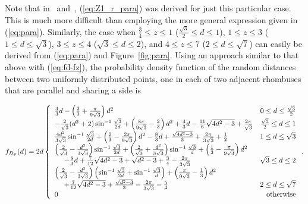 \documentclass[12pt,draftclsnofoot,onecolumn]{IEEEtran}
\begin{document}
Note that in~\cite{zhuang2011random}
and~\cite{zhuang2012geometrical}, (\ref{eq:Z1_r_para}) was derived for just this particular case.
This is much more difficult than employing the more general expression given in (\ref{eq:para}).
Similarly, the case when $\frac{3}{4} \leq z \leq 1$ ($\frac{\sqrt{3}}{2}\leq
d\leq 1$), $1 \leq z \leq 3$ ($1\leq d\leq \sqrt{3}$), $3 \leq z \leq 4$ ($\sqrt{3}\leq
d\leq 2$), and $4 \leq z \leq 7$ ($2\leq d\leq \sqrt{7}$) can
easily be derived from (\ref{eq:para}) and Figure~\ref{fig:para}.
Using an approach similar to that above with (\ref{eq:fd-fz}), the probability density
function of the random distances between two uniformly distributed points, one
in each of two adjacent rhombuses that are parallel and sharing a side is
\begin{small}
 \begin{equation}\label{eq:fd_r_para}
  f_{D_{\rm P}}(d)=2d\left\{
    \begin{array}{lr}

\frac{4}{3}d-\left(\frac{2}{3}+\frac{\pi}{9\sqrt{3}}\right)d^2 & 0\leq d\leq
\frac{\sqrt{3}}{2}\\

-\frac{2}{\sqrt{3}}(d^2+2)\sin^{-1}\frac{\sqrt{3}}{2d}+\left(\frac{8\pi}
{9\sqrt{3}}-\frac{2}{3}\right)d^2+\frac{4}{3}d-\frac{11}{6}\sqrt{4d^2-3}+\frac{
2\pi}{\sqrt{3}} & \frac{\sqrt{3}}{2}\leq d\leq 1\\

\frac{4d^2}{3\sqrt{3}}\sin^{-1}\frac{\sqrt{3}}{2d}+\left(\frac{2}{3}
-\frac{2\pi}{9\sqrt{3}}\right)d^2-\frac{8}{3}d+\frac{\sqrt{4d^2-3}}{3}+\frac{
2\pi}{3\sqrt{3}}+\frac{1}{2} & 1\leq d\leq \sqrt{3} \\

\left(\frac{2}{\sqrt{3}}-\frac{d^2}{3\sqrt{3}}\right)\sin^{-1}\frac{\sqrt
{3}}{2d}+\left(\frac{2}{\sqrt{3}}+\frac{d^2}{3\sqrt{3}}\right)\sin^{-1}\frac{
\sqrt{3}}{d}+\left(\frac{1}{3}-\frac{\pi}{9\sqrt{3}}\right)d^2 \\
~~~~-\frac{8}{3}d+\frac{7}{12}\sqrt{4d^2-3}+\sqrt{d^2-3}+\frac{3}{4}
-\frac{2\pi}{3\sqrt{3}} & \sqrt{3}\leq d\leq 2 \\

\left(\frac{2}{\sqrt{3}}-\frac{d^2}{3\sqrt{3}}\right)\left(\sin^{-1}\frac{
\sqrt{3}}{2d}+\sin^{-1}\frac{\sqrt{3}}{d}\right)+\left(\frac{\pi}{9\sqrt{3}}
-\frac{1}{3 }\right)d^2 \\
~~~~+\frac{7}{12}\sqrt{4d^2-3}+\frac{\sqrt{d^2-3}}{3}-\frac{2\pi}{3\sqrt{3}}
-\frac{5}{4} & 2 \leq d \leq \sqrt{7} \\

      0 & {\rm otherwise}
    \end{array}
 \right..
\end{equation}
\end{small}
\end{document}
